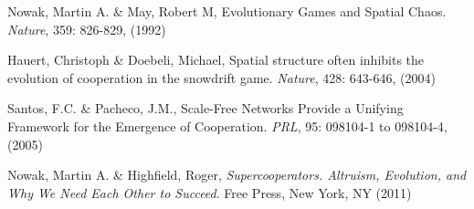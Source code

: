 \begin{thebibliography}{50}


 Nowak, Martin A. \& May, Robert M, Evolutionary
  Games and Spatial Chaos. \textit{Nature}, 359: 826-829, (1992)

 Hauert, Christoph \& Doebeli, Michael, Spatial
  structure often inhibits the evolution of cooperation in the
  snowdrift game. \textit{Nature}, 428: 643-646,  (2004)

 Santos, F.C. \& Pacheco, J.M., Scale-Free
  Networks Provide a Unifying Framework for the Emergence of
  Cooperation. \textit{PRL}, 95: 098104-1 to 098104-4, (2005) 

 Nowak, Martin A. \& Highfield, Roger,
  \textit{Supercooperators. Altruism, Evolution, and Why We Need Each
    Other to Succeed}. Free Press, New York, NY  (2011)
  
%
\end{thebibliography}



